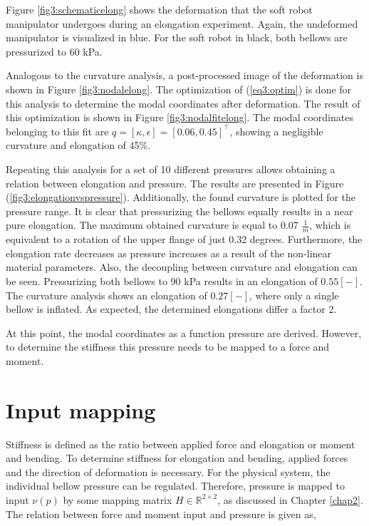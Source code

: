 Figure \ref{fig3:schematicelong} shows the deformation that the soft robot manipulator undergoes during an elongation experiment. Again, the undeformed manipulator is visualized in blue. For the soft robot in black, both bellows are pressurized to 60 kPa. 




Analogous to the curvature analysis, a post-processed image of the deformation is shown in Figure \ref{fig3:nodalelong}. The optimization of (\ref{eq3:optim}) is done for this analysis to determine the modal coordinates after deformation. The result of this optimization is shown in Figure \ref{fig3:nodalfitelong}. The modal coordinates belonging to this fit are $q = [\kappa,\epsilon] = [0.06, 0.45]^\top$, showing a negligible curvature and elongation of 45\%. 

Repeating this analysis for a set of 10 different pressures allows obtaining a relation between elongation and pressure. The results are presented in Figure (\ref{fig3:elongationvspressure}). Additionally, the found curvature is plotted for the pressure range. It is clear that pressurizing the bellows equally results in a near pure elongation. The maximum obtained curvature is equal to 0.07 $\frac{1}{m}$, which is equivalent to a rotation of the upper flange of just 0.32 degrees. Furthermore, the elongation rate decreases as pressure increases as a result of the non-linear material parameters. Also, the decoupling between curvature and elongation can be seen. Pressurizing both bellows to 90 kPa results in an elongation of $0.55 [-]$. The curvature analysis shows an elongation of $0.27 [-]$, where only a single bellow is inflated. As expected, the determined elongations differ a factor 2. 

At this point, the modal coordinates as a function pressure are derived. However, to determine the stiffness this pressure needs to be mapped to a force and moment. 






\section{Input mapping}
\label{sec3:InputMapping}

Stiffness is defined as the ratio between applied force and elongation or moment and bending. To determine stiffness for elongation and bending, applied forces and the direction of deformation is necessary. For the physical system, the individual bellow pressure can be regulated. Therefore, pressure is mapped to input $\nu(p)$ by some mapping matrix $H \in \mathbb{R}^{2 \times 2}$, as discussed in Chapter \ref{chap2}. The relation between force and moment input and pressure is given as, 

